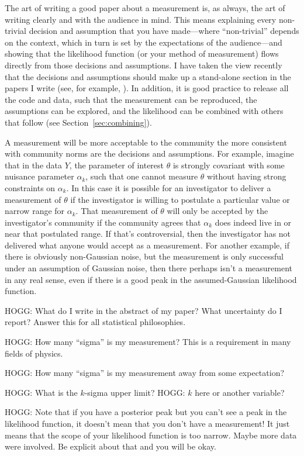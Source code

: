 \documentclass{article}
\newcommand{\sectionname}{Section}
\newcommand{\secref}[1]{\sectionname~\ref{#1}}
\begin{document}
The art of writing a good paper about a measurement is, as always, the art of writing clearly and with the audience in mind.
This means explaining every non-trivial decision and assumption that you have made---where ``non-trivial'' depends on the context, which in turn is set by the expectations of the audience---and showing that the likelihood function (or your method of measurement) flows directly from those decisions and assumptions.
I have taken the view recently that the decisions and assumptions should make up a stand-alone section in the papers I write (see, for example, \cite{frizzle}).
In addition, it is good practice to release all the code and data, such that the measurement can be reproduced, the assumptions can be explored, and the likelihood can be combined with others that follow (see \secref{sec:combining}).

A measurement will be more acceptable to the community the more consistent with community norms are the decisions and assumptions.
For example, imagine that in the data $Y$, the parameter of interest $\theta$ is strongly covariant with some nuisance parameter $\alpha_k$,
such that one cannot measure $\theta$ without having strong constraints on $\alpha_k$.
In this case it is possible for an investigator to deliver a measurement of $\theta$ if the investigator is willing to postulate a particular value or narrow range for $\alpha_k$.
That measurement of $\theta$ will only be accepted by the investigator's community if the community agrees that $\alpha_k$ does indeed live in or near that postulated range.
If that's controversial, then the investigator has not delivered what anyone would accept as a measurement.
For another example, if there is obviously non-Gaussian noise, but the measurement is only successful under an assumption of Gaussian noise, then there perhaps isn't a measurement in any real sense, even if there is a good peak in the assumed-Gaussian likelihood function.

HOGG: What do I write in the abstract of my paper? What uncertainty do I report? Answer this for all statistical philosophies.

HOGG: How many ``sigma'' is my measurement? This is a requirement in many fields of physics.

HOGG: How many ``sigma'' is my measurement away from some expectation?

HOGG: What is the $k$-sigma upper limit? HOGG: $k$ here or another variable?

HOGG: Note that if you have a posterior peak but you can't see a peak in the likelihood function, it doesn't mean that you don't have a measurement! It just means that the scope of your likelihood function is too narrow. Maybe more data were involved. Be explicit about that and you will be okay.
\end{document}
